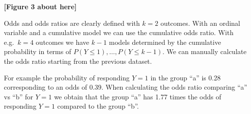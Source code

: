 \documentclass[
  man,floatsintext]{apa6}
\newenvironment{Shaded}{\begin{snugshade}}{\end{snugshade}}
\newcommand{\CommentTok}[1]{\textcolor[rgb]{0.56,0.35,0.01}{\textit{#1}}}
\newcommand{\ControlFlowTok}[1]{\textcolor[rgb]{0.13,0.29,0.53}{\textbf{#1}}}
\newcommand{\DecValTok}[1]{\textcolor[rgb]{0.00,0.00,0.81}{#1}}
\newcommand{\FunctionTok}[1]{\textcolor[rgb]{0.13,0.29,0.53}{\textbf{#1}}}
\newcommand{\NormalTok}[1]{#1}
\newcommand{\OtherTok}[1]{\textcolor[rgb]{0.56,0.35,0.01}{#1}}
\newcommand{\SpecialCharTok}[1]{\textcolor[rgb]{0.81,0.36,0.00}{\textbf{#1}}}
\newcommand{\StringTok}[1]{\textcolor[rgb]{0.31,0.60,0.02}{#1}}
\begin{document}
\begin{center}\textbf{[Figure 3 about here]} \end{center}

\normalsize

Odds and odds ratios are clearly defined with \(k = 2\) outcomes. With an ordinal variable and a cumulative model we can use the cumulative odds ratio. With e.g.~\(k = 4\) outcomes we have \(k - 1\) models determined by the cumulative probability in terms of \(P(Y \leq 1), \dots, P(Y \leq k - 1)\). We can manually calculate the odds ratio starting from the previous dataset.

\scriptsize

\begin{Shaded}
\end{Shaded}

\normalsize

For example the probability of responding \(Y = 1\) in the group ``a'' is 0.28 corresponding to an odds of 0.39. When calculating the odds ratio comparing ``a'' vs ``b'' for \(Y = 1\) we obtain that the group ``a'' has 1.77 times the odds of responding \(Y = 1\) compared to the group ``b''.
\end{document}
